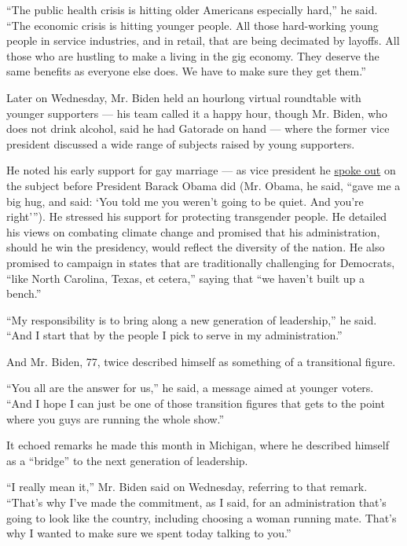 ``The public health crisis is hitting older Americans especially hard,''
he said. ``The economic crisis is hitting younger people. All those
hard-working young people in service industries, and in retail, that are
being decimated by layoffs. All those who are hustling to make a living
in the gig economy. They deserve the same benefits as everyone else
does. We have to make sure they get them.''

Later on Wednesday, Mr. Biden held an hourlong virtual roundtable with
younger supporters --- his team called it a happy hour, though Mr.
Biden, who does not drink alcohol, said he had Gatorade on hand ---
where the former vice president discussed a wide range of subjects
raised by young supporters.

He noted his early support for gay marriage --- as vice president he
\href{https://www.nytimes.com/2014/04/20/magazine/how-the-president-got-to-i-do-on-same-sex-marriage.html}{spoke
out} on the subject before President Barack Obama did (Mr. Obama, he
said, ``gave me a big hug, and said: `You told me you weren't going to
be quiet. And you're right'''). He stressed his support for protecting
transgender people. He detailed his views on combating climate change
and promised that his administration, should he win the presidency,
would reflect the diversity of the nation. He also promised to campaign
in states that are traditionally challenging for Democrats, ``like North
Carolina, Texas, et cetera,'' saying that ``we haven't built up a
bench.''

``My responsibility is to bring along a new generation of leadership,''
he said. ``And I start that by the people I pick to serve in my
administration.''

And Mr. Biden, 77, twice described himself as something of a
transitional figure.

``You all are the answer for us,'' he said, a message aimed at younger
voters. ``And I hope I can just be one of those transition figures that
gets to the point where you guys are running the whole show.''

It echoed remarks he made this month in Michigan, where he described
himself as a ``bridge'' to the next generation of leadership.

``I really mean it,'' Mr. Biden said on Wednesday, referring to that
remark. ``That's why I've made the commitment, as I said, for an
administration that's going to look like the country, including choosing
a woman running mate. That's why I wanted to make sure we spent today
talking to you.''

